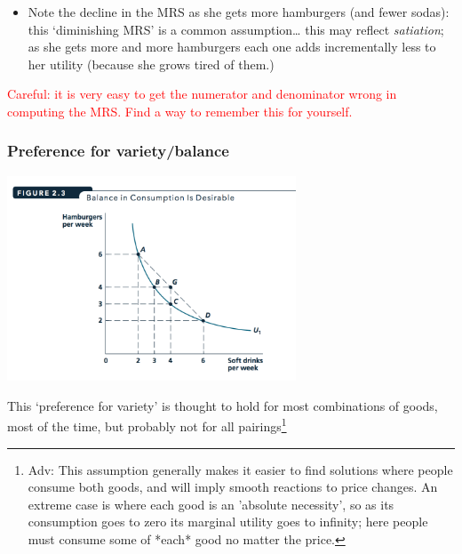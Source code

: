 \documentclass[]{article}
\providecommand{\tightlist}{%
  \setlength{\itemsep}{0pt}\setlength{\parskip}{0pt}}
\begin{document}
\begin{itemize}
\tightlist
\item
  Note the decline in the MRS as she gets more hamburgers (and fewer
  sodas): this `diminishing MRS' is a common assumption\ldots{} this may
  reflect \emph{satiation}; as she gets more and more hamburgers each
  one adds incrementally less to her utility (because she grows tired of
  them.)
\end{itemize}

\textcolor{red}{Careful: it is very easy to get the numerator and denominator wrong in computing the MRS. Find a way to remember this for yourself.}

\hypertarget{preference-for-varietybalance}{%
\subsubsection{Preference for
variety/balance}\label{preference-for-varietybalance}}

\includegraphics[height=2.4in]{picsfigs/indifcurvebalance.png}

This `preference for variety' is thought to hold for most combinations
of goods, most of the time, but probably not for all pairings\footnote{\textcolor{RawSienna}{Adv: This  assumption generally makes it easier to find solutions where people consume both goods, and will imply smooth reactions to price changes.
  An extreme case is where each good is an 'absolute necessity', so as its consumption goes to zero its marginal utility goes to infinity; here people must consume some of *each* good no matter the price.}}
\end{document}
